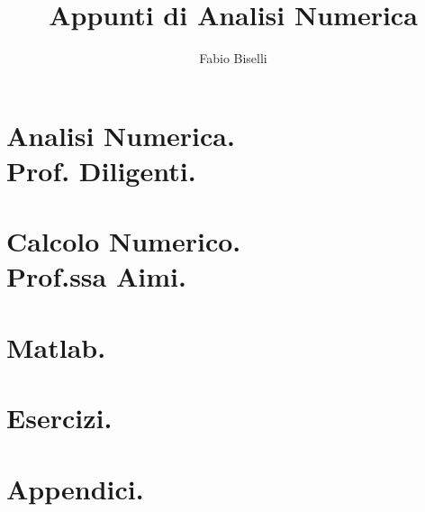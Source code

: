 \documentclass[a4paper, 12pt]{report}
\title{Appunti di Analisi Numerica}
\author{Fabio Biselli}
\date {}
\theoremstyle{definition}
\theoremstyle{remark}
\begin{document}
{\samepage
\maketitle
\begin{versionhistory}
\end{versionhistory}
}


\tableofcontents

\part{Analisi Numerica. \\Prof. Diligenti.}
\label{Analisi Numerica.}











\part{Calcolo Numerico. \\Prof.ssa Aimi.}
\label{Calcolo Numerico.}



\part{Matlab.}
\label{Matlab.}

\part{Esercizi.}
\label{Esercizi.}





\part{Appendici.}
\label{Appendici}
\appendix
\label{Appendice}

\end{document}
